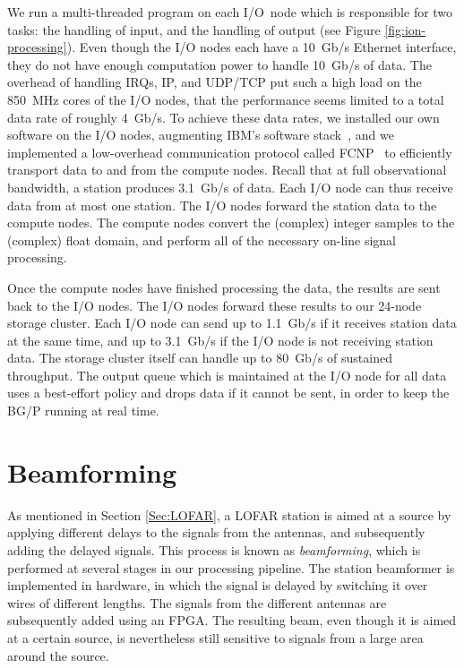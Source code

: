 \documentclass{llncs}
\begin{document}
We run a multi-threaded program on each I/O~node which is responsible for two tasks: the handling of input, and the handling of output (see Figure \ref{fig:ion-processing}). Even though the I/O nodes each have a 10~Gb/s Ethernet interface, they do not have enough computation power to handle 10~Gb/s of data. The overhead of handling IRQs, IP, and UDP/TCP put such a high load on the 850~MHz cores of the I/O nodes, that the performance seems limited to a total data rate of roughly 4~Gb/s. To achieve these data rates, we installed our own software on the I/O nodes, augmenting IBM's software stack~\cite{Yoshii:10}, and we implemented a low-overhead communication protocol called FCNP~\cite{Romein:09a} to efficiently transport data to and from the compute nodes. Recall that at full observational bandwidth, a station produces 3.1~Gb/s of data. Each I/O node can thus receive data from at most one station. The I/O nodes forward the station data to the compute nodes. The compute nodes convert the (complex) integer samples to the (complex) float domain, and perform all of the necessary on-line signal processing.

Once the compute nodes have finished processing the data, the results are sent back to the I/O nodes. The I/O nodes forward these results to our 24-node storage cluster. Each I/O node can send up to 1.1~Gb/s if it receives station data at the same time, and up to 3.1~Gb/s if the I/O node is not receiving station data. The storage cluster itself can handle up to 80~Gb/s of sustained throughput. The output queue which is maintained at the I/O node for all data uses a best-effort policy and drops data if it cannot be sent, in order to keep the BG/P running at real time.


\section{Beamforming}
\label{Sec:Beamforming}

As mentioned in Section \ref{Sec:LOFAR}, a LOFAR station is aimed at a source by applying different delays to the signals from the antennas, and subsequently adding the delayed signals. This process is known as \emph{beamforming}, which is performed at several stages in our processing pipeline. The station beamformer is implemented in hardware, in which the signal is delayed by switching it over wires of different lengths. The signals from the different antennas are subsequently added using an FPGA. The resulting beam, even though it is aimed at a certain source, is nevertheless still sensitive to signals from a large area around the source.
\end{document}
